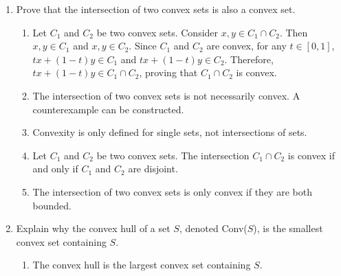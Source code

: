 \documentclass{article}%
\begin{document}
\begin{enumerate}
\begin{enumerate}
\vspace{0.5em}%
\item Using Caratheodory's Theorem, explain why any point in the convex hull of a set $S$ in $\mathbb{R}^m$ can be expressed as a convex combination of at most $m+1$ points from $S$.%
\begin{enumerate}%
\item Caratheodory's Theorem directly states this property; no further explanation is needed.%
\item The proof involves constructing a linear program and showing that its optimal solution uses at most $m+1$ points from $S$.%
\item This is a consequence of the Separation Theorem.%
\item This is only true if $S$ is a finite set.%
\item This is only true if $S$ is a convex set.%
\end{enumerate}%
\vspace{0.5em}%
\end{enumerate}%
\item Prove that the intersection of two convex sets is also a convex set.%
\begin{enumerate}%
\item Let $C_1$ and $C_2$ be two convex sets.  Consider $x, y \in C_1 \cap C_2$. Then $x, y \in C_1$ and $x, y \in C_2$. Since $C_1$ and $C_2$ are convex, for any $t \in [0, 1]$, $tx + (1-t)y \in C_1$ and $tx + (1-t)y \in C_2$. Therefore, $tx + (1-t)y \in C_1 \cap C_2$, proving that $C_1 \cap C_2$ is convex.%
\item The intersection of two convex sets is not necessarily convex. A counterexample can be constructed.%
\item Convexity is only defined for single sets, not intersections of sets.%
\item Let $C_1$ and $C_2$ be two convex sets.  The intersection $C_1 \cap C_2$ is convex if and only if $C_1$ and $C_2$ are disjoint.%
\item The intersection of two convex sets is only convex if they are both bounded.%
\end{enumerate}%
\vspace{1em}%
\item Explain why the convex hull of a set $S$, denoted Conv($S$), is the smallest convex set containing $S$.%
\begin{enumerate}%
\item The convex hull is the largest convex set containing $S$.%

\end{enumerate}
\end{enumerate}
\end{document}
